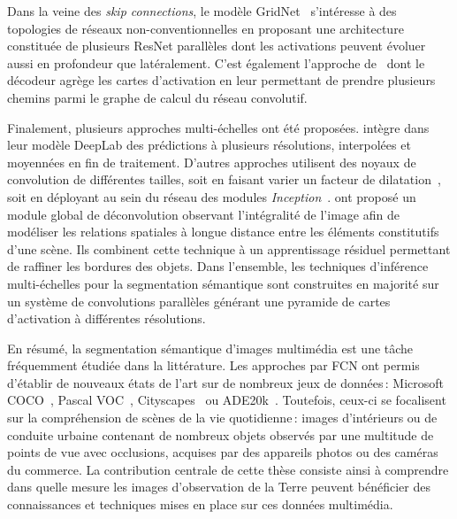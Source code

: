 Dans la veine des \emph{skip connections}, le modèle GridNet~\cite{fourure_residual_2017} s'intéresse à des topologies de réseaux non-conventionnelles en proposant une architecture constituée de plusieurs ResNet parallèles dont les activations peuvent évoluer aussi en profondeur que latéralement. C'est également l'approche de~\citet{liu_path_2018} dont le décodeur agrège les cartes d'activation en leur permettant de prendre plusieurs chemins parmi le graphe de calcul du réseau convolutif.

Finalement, plusieurs approches multi-échelles ont été proposées. \citet{l._c._chen_deeplab_2018} intègre dans leur modèle DeepLab des prédictions à plusieurs résolutions, interpolées et moyennées en fin de traitement. D'autres approches utilisent des noyaux de convolution de différentes tailles, soit en faisant varier un facteur de dilatation~\cite{yu_multi-scale_2015}, soit en déployant au sein du réseau des modules \emph{Inception}~\cite{szegedy_going_2015,nekrasov_global_2016,zhao_pyramid_2017}. \citet{peng_large_2017} ont proposé un module global de déconvolution observant l'intégralité de l'image afin de modéliser les relations spatiales à longue distance entre les éléments constitutifs d'une scène. Ils combinent cette technique à un apprentissage résiduel permettant de raffiner les bordures des objets. Dans l'ensemble, les techniques d'inférence multi-échelles pour la segmentation sémantique sont construites en majorité sur un système de convolutions parallèles générant une pyramide de cartes d'activation à différentes résolutions.

En résumé, la segmentation sémantique d'images multimédia est une tâche fréquemment étudiée dans la littérature. Les approches par \gls{FCN} ont permis d'établir de nouveaux états de l'art sur de nombreux jeux de données\,: Microsoft COCO~\cite{lin_microsoft_2014}, Pascal VOC~\cite{everingham_pascal_2014}, Cityscapes~\cite{cordts_cityscapes_2016} ou ADE20k~\cite{zhou_scene_2017}. Toutefois, ceux-ci se focalisent sur la compréhension de scènes de la vie quotidienne\,: images d'intérieurs ou de conduite urbaine contenant de nombreux objets observés par une multitude de points de vue avec occlusions, acquises par des appareils photos ou des caméras du commerce. La contribution centrale de cette thèse consiste ainsi à comprendre dans quelle mesure les images d'observation de la Terre peuvent bénéficier des connaissances et techniques mises en place sur ces données multimédia.

